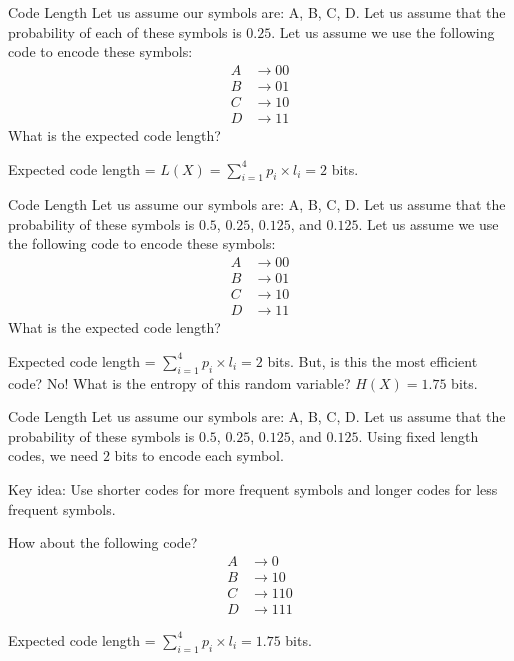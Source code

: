 \documentclass[handout]{beamer}
\begin{document}
\begin{frame}{Code Length}
Let us assume our symbols are: A, B, C, D. Let us assume that the probability of each of these symbols is $0.25$. 
Let us assume we use the following code to encode these symbols:
\begin{align*}
    A &\rightarrow 00 \\
    B &\rightarrow 01 \\
    C &\rightarrow 10 \\
    D &\rightarrow 11
\end{align*}
What is the expected code length?

Expected code length = $L(X) = \sum_{i=1}^4 p_i \times l_i = 2$ bits.
    
\end{frame}

\begin{frame}{Code Length}
    Let us assume our symbols are: A, B, C, D. Let us assume that the probability of these symbols is $0.5$, $0.25$, $0.125$, and $0.125$. 
    Let us assume we use the following code to encode these symbols:
    \begin{align*}
        A &\rightarrow 00 \\
        B &\rightarrow 01 \\
        C &\rightarrow 10 \\
        D &\rightarrow 11
    \end{align*}
    What is the expected code length?
    
    Expected code length = $\sum_{i=1}^4 p_i \times l_i = 2$ bits.
    But, is this the most efficient code?
    \pause No! What is the entropy of this random variable?
    \pause $H(X) = 1.75$ bits.
        
    \end{frame}

    \begin{frame}{Code Length}
        Let us assume our symbols are: A, B, C, D. Let us assume that the probability of these symbols is $0.5$, $0.25$, $0.125$, and $0.125$. 
        Using fixed length codes, we need $2$ bits to encode each symbol.

        Key idea: Use shorter codes for more frequent symbols and longer codes for less frequent symbols.

        How about the following code?
        \begin{align*}
            A &\rightarrow 0 \\
            B &\rightarrow 10 \\
            C &\rightarrow 110 \\
            D &\rightarrow 111
        \end{align*}

        Expected code length = $\sum_{i=1}^4 p_i \times l_i = 1.75$ bits.
        
    \end{frame}
\end{document}
